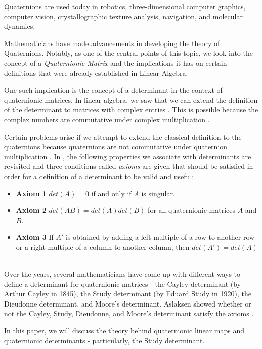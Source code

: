 Quaternions are used today in robotics, three-dimensional computer graphics, computer vision, crystallographic texture analysis, navigation, and molecular dynamics. 

Mathematicians have made advancements in developing the theory of Quaternions. Notably, as one of the central points of this topic, we look into the concept of a \emph{Quaternionic Matrix} and the implications it has on certain definitions that were already established in Linear Algebra. 

One such implication is the concept of a determinant in the context of quaternionic matrices. In linear algebra, we saw that we can extend the definition of the determinant to matrices with complex entries \cite{stamaria}. This is possible because the complex numbers are commutative under complex multiplication \cite{aslaksen}. 

Certain problems arise if we attempt to extend the classical definition to the quaternions because quaternions are not commutative under quaternion multiplication \cite{aslaksen}. In \cite{aslaksen}, the following properties we associate with determinants are revisited and three conditions called \emph{axioms} are given that should be satisfied in order for a definition of a determinant to be valid and useful:
\begin{itemize}
	\item \textbf{Axiom 1} $det(A) = 0$ if and only if $A$ is singular.
	\item \textbf{Axiom 2} $det(AB) = det(A)det(B)$ for all quaternionic matrices $A$ and $B$.
	\item \textbf{Axiom 3} If $A'$ is obtained by adding a left-multiple of a row to another row or a right-multiple of a column to another column, then $det(A')=det(A)$.
\end{itemize}

Over the years, several mathematicians have come up with different ways to define a determinant for quaternionic matrices - the Cayley determinant (by Arthur Cayley in 1845), the Study determinant (by Eduard Study in 1920), the Dieudonne determinant, and Moore's determinant. Aslaksen showed whether or not the Cayley, Study, Dieudonne, and Moore's determinant satisfy the axioms \cite{aslaksen}.

In this paper, we will discuss the theory behind quaternionic linear maps and quaternionic determinants - particularly, the Study determinant. 
\iffalse
We will then use the Study determinant to extend a result in \cite{stamaria} to the set of all skew-coninvolutory quaternionic matrices, i.e., we will show that the set of all $n \times n$ skew-coninvolutory quaternionic matrices is empty when $n$ is odd. 
\fi
\newpage
